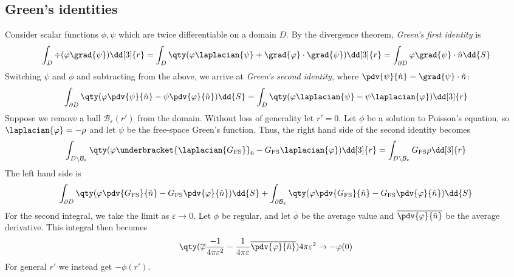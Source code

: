 \subsection{Green's identities}
Consider scalar functions $\phi, \psi$ which are twice differentiable on a domain $D$.
By the divergence theorem, \textit{Green's first identity} is
\begin{align} \label{eq:10.17}
	\int_D \div(\phi \grad{\psi}) \dd[3]{r} = \int_D \qty(\phi \laplacian{\psi} + \grad{\phi} \cdot \grad{\psi}) \dd[3]{r} = \int_{\partial D} \phi \grad{\psi} \cdot \hat n \dd{S}
\end{align}
Switching $\psi$ and $\phi$ and subtracting from the above, we arrive at \textit{Green's second identity}, where $\pdv{\psi}{\hat n} = \grad{\psi} \cdot \hat n$:
\begin{align} \label{eq:10.18}
	\int_{\partial D} \qty(\phi \pdv{\psi}{\hat n} - \psi \pdv{\phi}{\hat n}) \dd{S} = \int_D \qty(\phi \laplacian{\psi} - \psi \laplacian{\phi}) \dd[3]{r}
\end{align}
Suppose we remove a ball $\mathcal B_\varepsilon(r')$ from the domain.
Without loss of generality let $r' = 0$.
Let $\phi$ be a solution to Poisson's equation, so $\laplacian{\phi} = -\rho$ and let $\psi$ be the free-space Green's function.
Thus, the right hand side of the second identity becomes
\begin{align*}
	\int_{D \setminus \mathcal B_\varepsilon} \qty(\phi \underbracket{\laplacian{G_{\mathrm{FS}}}}_0 - G_{\mathrm{FS}} \laplacian{\phi}) \dd[3]{r} = \int_{D \setminus \mathcal B_\varepsilon} G_{\mathrm{FS}} \rho \dd[3]{r}
\end{align*}
The left hand side is
\begin{align*}
	\int_{\partial D} \qty(\phi \pdv{G_{\mathrm{FS}}}{\hat n} - G_{\mathrm{FS}} \pdv{\phi}{\hat n}) \dd{S} + \int_{\partial \mathcal B_\varepsilon} \qty(\phi \pdv{G_{\mathrm{FS}}}{\hat n} - G_{\mathrm{FS}} \pdv{\phi}{\hat n}) \dd{S}
\end{align*}
For the second integral, we take the limit as $\varepsilon \to 0$.
Let $\phi$ be regular, and let $\overline\phi$ be the average value and $\overline{\pdv{\phi}{\hat n}}$ be the average derivative.
This integral then becomes
\begin{align*}
	\qty(\overline\phi \frac{-1}{4 \pi \varepsilon^2} - \frac{1}{4 \pi \varepsilon} \overline{\pdv{\phi}{\hat n}}) 4 \pi \varepsilon^2 \to -\phi(0)
\end{align*}
For general $r'$ we instead get $- \phi(r')$.

